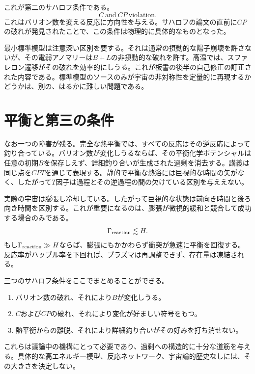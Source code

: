 これが第二のサハロフ条件である。
\begin{equation}
\boxed{C\ \text{and}\ CP\ \text{violation}.}
\end{equation}
これはバリオン数を変える反応に方向性を与える。サハロフの論文の直前に\(CP\)の破れが発見されたことで、この条件は物理的に具体的なものとなった。

最小標準模型は注意深い区別を要する。それは通常の摂動的な陽子崩壊を許さないが、その電弱アノマリーは\(B+L\)の非摂動的な破れを許す。高温では、スファレロン遷移がその破れを効率的にしうる。これが板書の後半の自己修正の訂正された内容である。標準模型のソースのみが宇宙の非対称性を定量的に再現するかどうかは、別の、はるかに難しい問題である。

\section{平衡と第三の条件}

なお一つの障害が残る。完全な熱平衡では、すべての反応はその逆反応によって釣り合っている。バリオン数が変化しうるならば、その平衡化学ポテンシャルは任意の初期\(B\)を保存しえず、詳細釣り合いが生成された過剰を消去する。講義は同じ点を\(CPT\)を通じて表現する。静的で平衡な熱浴には巨視的な時間の矢がなく、したがって\(T\)因子は過程とその逆過程の間の欠けている区別を与ええない。

実際の宇宙は膨張し冷却している。したがって巨視的な状態は前向き時間と後ろ向き時間を区別する。これが重要になるのは、膨張が微視的緩和と競合して成功する場合のみである。
\begin{equation}
\Gamma_{\rm reaction}\lesssim H.
\label{eq:c08-freezeout-condition}
\end{equation}
もし\(\Gamma_{\rm reaction}\gg H\)ならば、膨張にもかかわらず衝突が急速に平衡を回復する。反応率がハッブル率を下回れば、プラズマは再調整できず、存在量は凍結される。

\begin{classroomqa}
\end{classroomqa}

三つのサハロフ条件をここでまとめることができる。
\begin{enumerate}
\item バリオン数の破れ、それにより\(B\)が変化しうる。
\item \(C\)および\(CP\)の破れ、それにより変化が好ましい符号をもつ。
\item 熱平衡からの離脱、それにより詳細釣り合いがその好みを打ち消せない。
\end{enumerate}
これらは議論中の機構にとって必要であり、過剰への構造的に十分な道筋を与える。具体的な高エネルギー模型、反応ネットワーク、宇宙論的歴史なしには、その大きさを決定しない。

